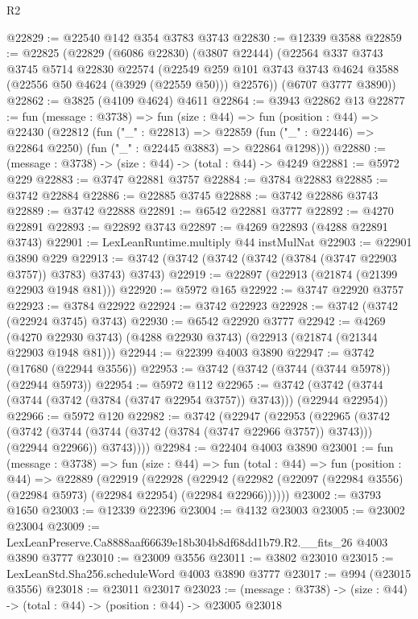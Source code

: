 \begin{lexlean}{R2}
\begin{coremodule}
@22829 := @22540 @142 @354 @3783 @3743
@22830 := @12339 @3588
@22859 := @22825
    (@22829
      (@6086 @22830)
      (@3807 @22444)
      (@22564
        @337
        @3743
        @3745
        @5714
        @22830
        @22574
        (@22549 @259 @101 @3743 @3743 @4624 @3588 (@22556 @50 @4624 (@3929 (@22559 @50))) @22576))
      (@6707 @3777 @3890))
@22862 := @3825 (@4109 @4624) @4611
@22864 := @3943 @22862 @13
@22877 := fun (message : @3738) =>
  fun (size : @44) =>
  fun (position : @44) =>
  @22430
    (@22812
      (fun ("_" : @22813) =>
      @22859 (fun ("_" : @22446) => @22864 @2250) (fun ("_" : @22445 @3883) => @22864 @1298)))
@22880 := (message : @3738) -> (size : @44) -> (total : @44) -> @4249
@22881 := @5972 @229
@22883 := @3747 @22881 @3757
@22884 := @3784 @22883
@22885 := @3742 @22884
@22886 := @22885 @3745
@22888 := @3742 @22886 @3743
@22889 := @3742 @22888
@22891 := @6542 @22881 @3777
@22892 := @4270 @22891
@22893 := @22892 @3743
@22897 := @4269 @22893 (@4288 @22891 @3743)
@22901 := LexLeanRuntime.multiply @44 instMulNat
@22903 := @22901 @3890 @229
@22913 := @3742 (@3742 (@3742 (@3742 (@3784 (@3747 @22903 @3757)) @3783) @3743) @3743)
@22919 := @22897 (@22913 (@21874 (@21399 @22903 @1948 @81)))
@22920 := @5972 @165
@22922 := @3747 @22920 @3757
@22923 := @3784 @22922
@22924 := @3742 @22923
@22928 := @3742 (@3742 (@22924 @3745) @3743)
@22930 := @6542 @22920 @3777
@22942 := @4269
    (@4270 @22930 @3743)
    (@4288 @22930 @3743)
    (@22913 (@21874 (@21344 @22903 @1948 @81)))
@22944 := @22399 @4003 @3890
@22947 := @3742 (@17680 (@22944 @3556))
@22953 := @3742 (@3742 (@3744 (@3744 @5978)) (@22944 @5973))
@22954 := @5972 @112
@22965 := @3742 (@3742 (@3744 (@3744 (@3742 (@3784 (@3747 @22954 @3757)) @3743))) (@22944 @22954))
@22966 := @5972 @120
@22982 := @3742
    (@22947
      (@22953
        (@22965
          (@3742
            (@3742 (@3744 (@3744 (@3742 (@3784 (@3747 @22966 @3757)) @3743))) (@22944 @22966))
            @3743))))
@22984 := @22404 @4003 @3890
@23001 := fun (message : @3738) =>
  fun (size : @44) =>
  fun (total : @44) =>
  fun (position : @44) =>
  @22889
    (@22919
      (@22928
        (@22942 (@22982 (@22097 (@22984 @3556) (@22984 @5973) (@22984 @22954) (@22984 @22966))))))
@23002 := @3793 @1650
@23003 := @12339 @22396
@23004 := @4132 @23003
@23005 := @23002 @23004
@23009 := LexLeanPreserve.Ca8888aaf66639e18b304b8df68dd1b79.R2.__fits_26 @4003 @3890 @3777
@23010 := @23009 @3556
@23011 := @3802 @23010
@23015 := LexLeanStd.Sha256.scheduleWord @4003 @3890 @3777
@23017 := @994 (@23015 @3556)
@23018 := @23011 @23017
@23023 := (message : @3738) -> (size : @44) -> (total : @44) -> (position : @44) -> @23005 @23018

\end{coremodule}
\end{lexlean}
